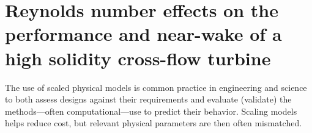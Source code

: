 \chapter{Reynolds number effects on the performance and near-wake of a high
solidity cross-flow turbine} \label{chap:Re-dep}

The use of scaled physical models is common practice in engineering and science
to both assess designs against their requirements and evaluate (validate) the
methods---often computational---use to predict their behavior. Scaling models
helps reduce cost, but relevant physical parameters are then often mismatched.

